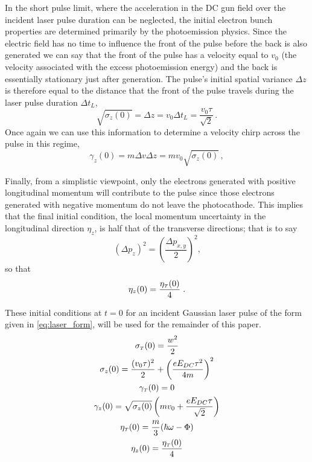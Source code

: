 In the short pulse limit, where the acceleration in the DC gun field over the incident laser pulse duration can be neglected, the initial electron bunch properties are determined primarily by the photoemission physics.
Since the electric field has no time to influence the front of the pulse before the back is also generated we can say that the front of the pulse has a velocity equal to $v_0$ (the velocity associated with the excess photoemission energy) and the back is essentially stationary just after generation.
The pulse's initial spatial variance $\Delta z$ is therefore equal to the distance that the front of the pulse travels during the laser pulse duration $\Delta t_L$,
\begin{equation} \label{eq:initial_sigma_z}
  \sqrt{ \sigma_{ z } ( 0 ) } = \Delta z = v_{ 0 } \Delta t_{L} = \frac{ v_{ 0 } \tau }{ \sqrt{ 2 } } \, \text{.}
\end{equation}
Once again we can use this information to determine a velocity chirp across the pulse in this regime,
\begin{equation}
  \gamma_{ z } ( 0 ) = m \Delta v \Delta z = m v_{ 0 } \sqrt{ \sigma_{ z } ( 0 ) } \, ,
\end{equation}

Finally, from a simplistic viewpoint, only the electrons generated with positive longitudinal momentum will contribute to the pulse since those electrons generated with negative momentum do not leave the photocathode.
This implies that the final initial condition, the local momentum uncertainty in the longitudinal direction $\eta_z$, is half that of the transverse directions; that is to say
\begin{equation}
  ( \Delta p_{ z } )^{2} = \left ( \frac{\Delta p_{ x , y }}{ 2 } \right )^{2} \text{,}
\end{equation}
so that
\begin{equation}
  \eta_{ z } ( 0 ) = \frac{ \eta_{ {\scriptscriptstyle T} } ( 0 )}{ 4 } \; \text{.}
\end{equation}

These initial conditions at $t=0$ for an incident Gaussian laser pulse of the form given in \ref{eq:laser_form}, will be used for the remainder of this paper.
\begin{subequations} \label{eq:summary}
  \begin{gather}
    \sigma_{ {\scriptscriptstyle T} } ( 0 ) = \frac{ w^{ 2 } }{ 2 } \\
    \sigma_{ z } ( 0 ) = \frac{ ( v_{ 0 } \tau )^{ 2 } }{ 2 } + \left ( \frac{ e E_{ DC } \tau^{ 2 } }{ 4 m } \right )^{ 2 } \\
    \gamma_{ {\scriptscriptstyle T} } ( 0 ) = 0 \\
    \gamma_{ z } ( 0 ) = \sqrt{ \sigma_{ z } ( 0 ) } \left ( m v_{ 0 } + \frac{ e E_{DC} \tau }{ \sqrt{ 2 } } \right ) \\
    \eta_{ {\scriptscriptstyle T} } ( 0 ) = \frac{ m }{ 3 } ( \hbar \omega - \Phi ) \\
    \eta_{ z } ( 0 ) = \frac{ \eta_{ {\scriptscriptstyle T} } ( 0 ) }{ 4 }
  \end{gather}
\end{subequations}


